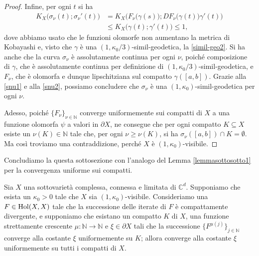 \begin{proof}
    Infine, per ogni $t$ si ha
    \begin{equation} \label{snu2}
        \begin{aligned}
            K_X\big(\sigma_\nu(t);\sigma_\nu'(t)\big)&=K_X\Big(F_\nu\big(\gamma(s)\big);DF_\nu\big(\gamma(t)\big)\gamma'(t)\Big) \\
            &\le K_X\big(\gamma(t);\gamma'(t)\big) \le 1,
        \end{aligned}
    \end{equation}
    dove abbiamo usato che le funzioni olomorfe non aumentano la metrica di Kobayashi e, visto che $\gamma$ è una $(1,\kappa_0/3)$-simil-geodetica, la \eqref{simil-geo2}. Si ha anche che la curva $\sigma_\nu$ è assolutamente continua per ogni $\nu$, poiché composizione di $\gamma$, che è assolutamente continua per definizione di $(1,\kappa_0/3)$-simil-geodetica, e $F_\nu$, che è olomorfa e dunque lipschitziana sul compatto $\gamma([a,b])$. Grazie alla \eqref{snu1} e alla \eqref{snu2}, possiamo concludere che $\sigma_\nu$ è una $(1,\kappa_0)$-simil-geodetica per ogni $\nu$.
    
    Adesso, poiché $\{F_\nu\}_{\nu\in\mathbb{N}}$ converge uniformemente sui compatti di $X$ a una funzione olomorfa $\psi$ a valori in $\partial X$, ne consegue che per ogni compatto $K\subseteq X$ esiste un $\nu(K)\in\mathbb{N}$ tale che, per ogni $\nu\ge\nu(K)$, si ha $\sigma_\nu([a,b])\cap K=\emptyset$. Ma così troviamo una contraddizione, perché $X$ è $(1,\kappa_0)$-visibile.
\end{proof}

Concludiamo la questa sottosezione con l'analogo del Lemma \ref{lemmasottosotto1} per la convergenza uniforme sui compatti.

\begin{lm} \label{lemmasottosotto2}
    Sia $X$ una sottovarietà complessa, connessa e limitata di $\mathbb{C}^d$. Supponiamo che esista un $\kappa_0>0$ tale che $X$ sia $(1,\kappa_0)$-visibile. Consideriamo una $F\in\textnormal{Hol}(X,X)$ tale che la successione delle iterate di $F$ è compattamente divergente, e supponiamo che esistano un compatto $K$ di $X$, una funzione strettamente crescente $\mu:\mathbb{N}\longrightarrow\mathbb{N}$ e $\xi\in\partial X$ tali che la successione $\{F^{\mu(j)}\}_{j\in\mathbb{N}}$ converge alla costante $\xi$ uniformemente su $K$; allora converge alla costante $\xi$ uniformemente su tutti i compatti di $X$.
\end{lm}

